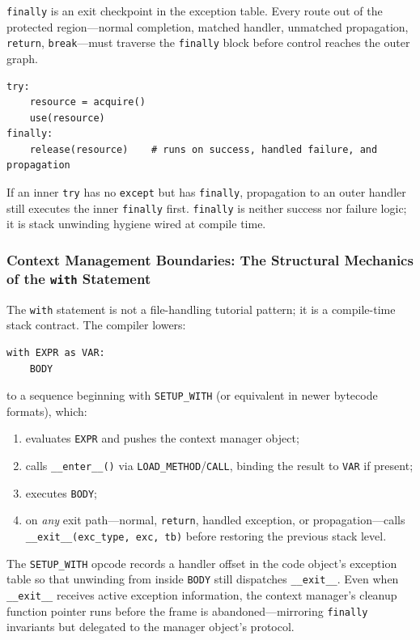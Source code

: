 \documentclass[a4paper,twoside]{report}
\begin{document}
\texttt{finally} is an exit checkpoint in the exception table. Every route out of the protected region---normal completion, matched handler, unmatched propagation, \texttt{return}, \texttt{break}---must traverse the \texttt{finally} block before control reaches the outer graph.

\begin{verbatim}
try:
    resource = acquire()
    use(resource)
finally:
    release(resource)    # runs on success, handled failure, and propagation
\end{verbatim}

If an inner \texttt{try} has no \texttt{except} but has \texttt{finally}, propagation to an outer handler still executes the inner \texttt{finally} first. \texttt{finally} is neither success nor failure logic; it is stack unwinding hygiene wired at compile time.

\subsubsection{Context Management Boundaries: The Structural Mechanics of the \texttt{with} Statement}

The \texttt{with} statement is not a file-handling tutorial pattern; it is a compile-time stack contract. The compiler lowers:

\begin{verbatim}
with EXPR as VAR:
    BODY
\end{verbatim}

to a sequence beginning with \texttt{SETUP\_WITH} (or equivalent in newer bytecode formats), which:

\begin{enumerate}
    \item evaluates \texttt{EXPR} and pushes the context manager object;
    \item calls \texttt{\_\_enter\_\_()} via \texttt{LOAD\_METHOD}/\texttt{CALL}, binding the result to \texttt{VAR} if present;
    \item executes \texttt{BODY};
    \item on \emph{any} exit path---normal, \texttt{return}, handled exception, or propagation---calls \texttt{\_\_exit\_\_(exc\_type, exc, tb)} before restoring the previous stack level.
\end{enumerate}

The \texttt{SETUP\_WITH} opcode records a handler offset in the code object's exception table so that unwinding from inside \texttt{BODY} still dispatches \texttt{\_\_exit\_\_}. Even when \texttt{\_\_exit\_\_} receives active exception information, the context manager's cleanup function pointer runs before the frame is abandoned---mirroring \texttt{finally} invariants but delegated to the manager object's protocol.
\end{document}
